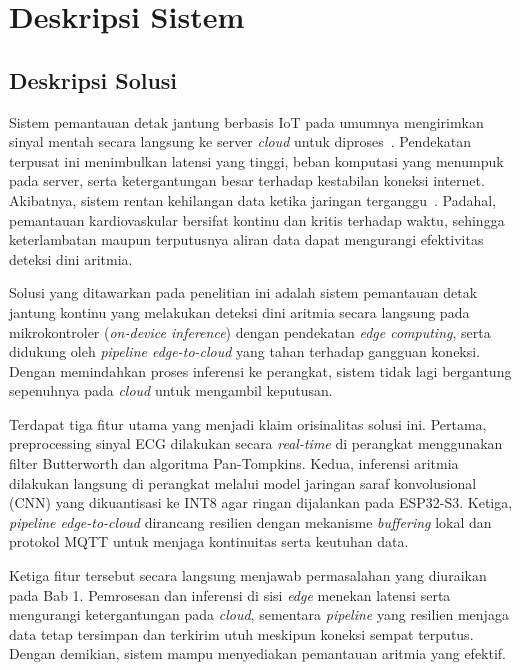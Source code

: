 \chapter{Deskripsi Sistem}
\label{chap:deskripsi-sistem}

\section{Deskripsi Solusi}
\label{sec:deskripsi-solusi}

Sistem pemantauan detak jantung berbasis IoT pada umumnya mengirimkan sinyal mentah secara langsung ke server \textit{cloud} untuk diproses~\cite{shi_2016}. Pendekatan terpusat ini menimbulkan latensi yang tinggi, beban komputasi yang menumpuk pada server, serta ketergantungan besar terhadap kestabilan koneksi internet. Akibatnya, sistem rentan kehilangan data ketika jaringan terganggu~\cite{escobedo_2026}. Padahal, pemantauan kardiovaskular bersifat kontinu dan kritis terhadap waktu, sehingga keterlambatan maupun terputusnya aliran data dapat mengurangi efektivitas deteksi dini aritmia.

Solusi yang ditawarkan pada penelitian ini adalah sistem pemantauan detak jantung kontinu yang melakukan deteksi dini aritmia secara langsung pada mikrokontroler (\textit{on-device inference}) dengan pendekatan \textit{edge computing}, serta didukung oleh \textit{pipeline edge-to-cloud} yang tahan terhadap gangguan koneksi. Dengan memindahkan proses inferensi ke perangkat, sistem tidak lagi bergantung sepenuhnya pada \textit{cloud} untuk mengambil keputusan.

Terdapat tiga fitur utama yang menjadi klaim orisinalitas solusi ini. Pertama, preprocessing sinyal ECG dilakukan secara \textit{real-time} di perangkat menggunakan filter Butterworth dan algoritma Pan-Tompkins. Kedua, inferensi aritmia dilakukan langsung di perangkat melalui model jaringan saraf konvolusional (CNN) yang dikuantisasi ke INT8 agar ringan dijalankan pada ESP32-S3. Ketiga, \textit{pipeline edge-to-cloud} dirancang resilien dengan mekanisme \textit{buffering} lokal dan protokol MQTT untuk menjaga kontinuitas serta keutuhan data.

Ketiga fitur tersebut secara langsung menjawab permasalahan yang diuraikan pada Bab 1. Pemrosesan dan inferensi di sisi \textit{edge} menekan latensi serta mengurangi ketergantungan pada \textit{cloud}, sementara \textit{pipeline} yang resilien menjaga data tetap tersimpan dan terkirim utuh meskipun koneksi sempat terputus. Dengan demikian, sistem mampu menyediakan pemantauan aritmia yang efektif.

